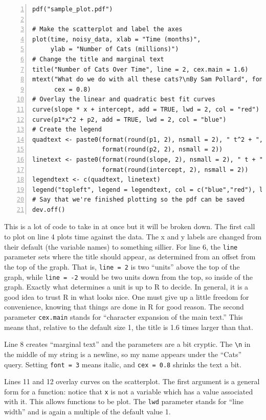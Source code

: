 \documentclass[12pt]{article}
\begin{document}
\begin{Verbatim}[frame=single, fontsize=\small, numbers=left]
pdf("sample_plot.pdf") 

# Make the scatterplot and label the axes
plot(time, noisy_data, xlab = "Time (months)",
     ylab = "Number of Cats (millions)")
# Change the title and marginal text
title("Number of Cats Over Time", line = 2, cex.main = 1.6)
mtext("What do we do with all these cats?\nBy Sam Pollard", font = 3,
      cex = 0.8)
# Overlay the linear and quadratic best fit curves
curve(slope * x + intercept, add = TRUE, lwd = 2, col = "red")
curve(p1*x^2 + p2, add = TRUE, lwd = 2, col = "blue")
# Create the legend
quadtext <- paste0(format(round(p1, 2), nsmall = 2), " t^2 + ",
                   format(round(p2, 2), nsmall = 2))
linetext <- paste0(format(round(slope, 2), nsmall = 2), " t + ",
                   format(round(intercept, 2), nsmall = 2))
legendtext <- c(quadtext, linetext)
legend("topleft", legend = legendtext, col = c("blue","red"), lwd = c(2,2))
# Say that we're finished plotting so the pdf can be saved
dev.off()
\end{Verbatim}

This is a lot of code to take in at once but it will be broken down. The first call to plot on line 4 plots time against the data. The x and y labels are changed from their default (the variable names) to something sillier. For line 6, the \verb|line| parameter sets where the title should appear, as determined from an offset from the top of the graph. That is, \verb|line = 2| is two ``units'' above the top of the graph, while \verb|line = -2| would be two units down from the top, so inside of the graph. Exactly what determines a unit is up to R to decide. In general, it is a good idea to trust R in what looks nice. One must give up a little freedom for convenience, knowing that things are done in R for good reason. The second parameter \verb|cex.main| stands for ``character expansion of the main text.'' This means that, relative to the default size 1, the title is 1.6 times larger than that.

Line 8 creates ``marginal text'' and the parameters are a bit cryptic. The \verb|\n| in the middle of my string is a newline, so my name appears under the ``Cats'' query. Setting \verb|font = 3| means italic, and \verb|cex = 0.8| shrinks the text a bit. 

Lines 11 and 12 overlay curves on the scatterplot. The first argument is a general form for a function: notice that \verb|x| is not a variable which has a value associated with it. This allows functions to be plot. The \verb|lwd| parameter stands for ``line width'' and is again a multiple of the default value 1.
\end{document}

